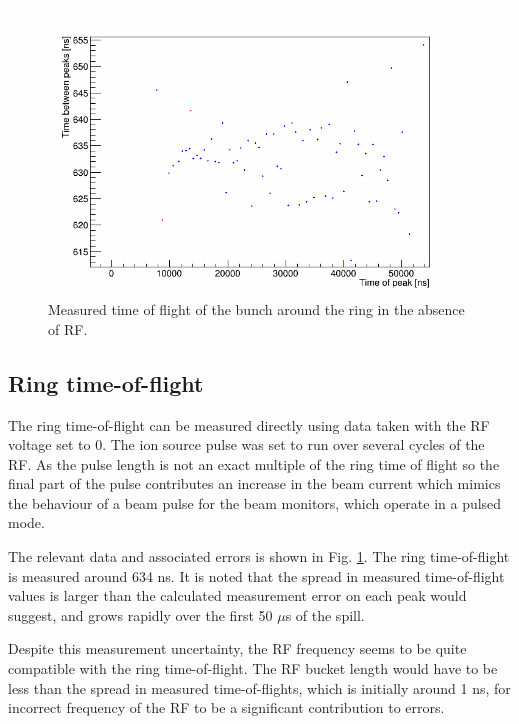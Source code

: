 \documentclass{paper}
\begin{document}
\begin{figure}
	\centering
		\includegraphics[width=\textwidth]{images/V=0_0_peak_deltas_zoom}
	\caption{Measured time of flight of the bunch around the ring in the absence
           of RF.}
	\label{fig:ring_time_of_flight}
\end{figure}


\subsection{Ring time-of-flight}
The ring time-of-flight can be measured directly using data taken with the RF
voltage set to 0. The ion source pulse was set to run over several cycles
of the RF. As the pulse length is not an exact multiple of the ring time of flight
so the final part of the pulse contributes an increase in the beam current which
mimics the behaviour of a beam pulse for the beam monitors, which operate in a
pulsed mode.

The relevant data and associated errors is shown in Fig. 
\ref{fig:ring_time_of_flight}. The ring time-of-flight is measured around 634 ns. It
is noted that the spread in measured time-of-flight values is larger than the
calculated measurement error on each peak would suggest, and grows rapidly over
the first 50 $\mu$s of the spill.

Despite this measurement uncertainty, the RF frequency seems to be quite 
compatible with the ring time-of-flight. The RF bucket length would have to be
less than the spread in measured time-of-flights, which is initially around 1 
ns, for incorrect frequency of the RF to be a significant contribution to
errors.
\end{document}

